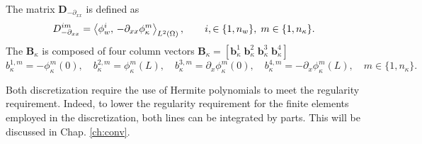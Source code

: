 The matrix $\mathbf{D}_{-\partial_{xx}}$ is defined as 
\begin{equation}
D_{-\partial_{xx}}^{im} = \inner[L^2(\Omega)]{\phi_w^i}{-\partial_{xx}\phi_\kappa^m}, \qquad i, \in \{1, n_w\}, \; m \in \{1, n_\kappa\}.
\end{equation}
The $\mathbf{B}_\kappa$ is composed of four column vectors $\mathbf{B}_\kappa = [\mathbf{b}_\kappa^{1} \; \mathbf{b}_\kappa^{2} \; \mathbf{b}_\kappa^3 \; \mathbf{b}_\kappa^4]$
\begin{equation}
{b}_\kappa^{1,m} = -\phi_\kappa^m(0), \quad {b}_\kappa^{2,m} = \phi_\kappa^m(L), \quad {b}_\kappa^{3,m} = \partial_x \phi_\kappa^m(0), \quad {b}_\kappa^{4,m} = -\partial_x \phi_\kappa^m(L) , \quad m \in \{1, n_\kappa\}.
\end{equation}

Both discretization require the use of Hermite polynomials to meet the regularity requirement. Indeed, to lower the regularity requirement for the finite elements employed in the discretization, both lines can be integrated by parts. This will be discussed in Chap. \ref{ch:conv}.


